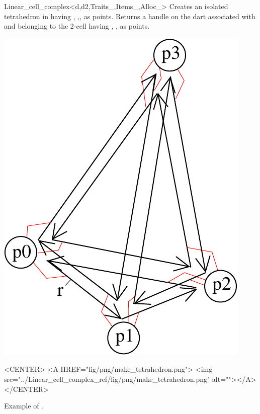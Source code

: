 \begin{ccRefClass}{Linear_cell_complex<d,d2,Traits_,Items_,Alloc_>}
{Creates an isolated tetrahedron in  having ,
  ,, as points.  Returns a handle on the dart
  associated with  and belonging to the 2-cell having
  , ,  as points.
    }
%
\def\LargFig{.3\textwidth}
  \begin{ccTexOnly}
    \begin{center}
      \includegraphics[width=\LargFig]{Linear_cell_complex_ref/fig/pdf/make_tetrahedron}
    \end{center}
  \end{ccTexOnly}
  \begin{ccHtmlOnly}
    <CENTER>
    <A HREF="fig/png/make_tetrahedron.png">
        <img src="../Linear_cell_complex_ref/fig/png/make_tetrahedron.png" alt=""></A>
    </CENTER>
    \end{ccHtmlOnly}
    \centerline{Example of .}


\end{ccRefClass}
